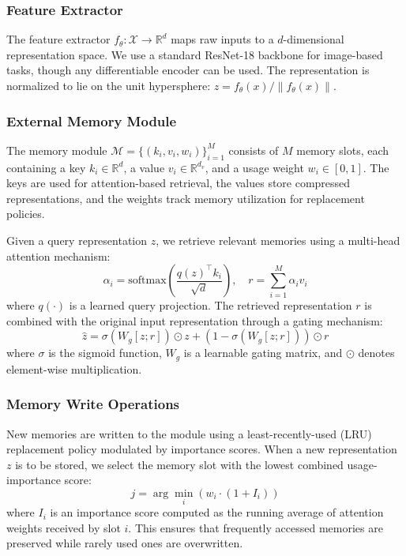 \documentclass[11pt]{article}
\begin{document}
\subsubsection{Feature Extractor}

The feature extractor $f_\theta: \mathcal{X} \rightarrow \mathbb{R}^d$ maps raw inputs to a $d$-dimensional representation space. We use a standard ResNet-18 backbone \citep{he2016deep} for image-based tasks, though any differentiable encoder can be used. The representation is normalized to lie on the unit hypersphere: $z = f_\theta(x) / \|f_\theta(x)\|$.

\subsubsection{External Memory Module}

The memory module $\mathcal{M} = \{(k_i, v_i, w_i)\}_{i=1}^{M}$ consists of $M$ memory slots, each containing a key $k_i \in \mathbb{R}^d$, a value $v_i \in \mathbb{R}^{d_v}$, and a usage weight $w_i \in [0, 1]$. The keys are used for attention-based retrieval, the values store compressed representations, and the weights track memory utilization for replacement policies.

Given a query representation $z$, we retrieve relevant memories using a multi-head attention mechanism:
\begin{equation}
    \alpha_i = \text{softmax}\left(\frac{q(z)^\top k_i}{\sqrt{d}}\right), \quad r = \sum_{i=1}^{M} \alpha_i v_i
\end{equation}
where $q(\cdot)$ is a learned query projection. The retrieved representation $r$ is combined with the original input representation through a gating mechanism:
\begin{equation}
    \hat{z} = \sigma(W_g [z; r]) \odot z + (1 - \sigma(W_g [z; r])) \odot r
\end{equation}
where $\sigma$ is the sigmoid function, $W_g$ is a learnable gating matrix, and $\odot$ denotes element-wise multiplication.

\subsubsection{Memory Write Operations}

New memories are written to the module using a least-recently-used (LRU) replacement policy modulated by importance scores. When a new representation $z$ is to be stored, we select the memory slot with the lowest combined usage-importance score:
\begin{equation}
    j = \arg\min_i \left( w_i \cdot (1 + I_i) \right)
\end{equation}
where $I_i$ is an importance score computed as the running average of attention weights received by slot $i$. This ensures that frequently accessed memories are preserved while rarely used ones are overwritten.
\end{document}
